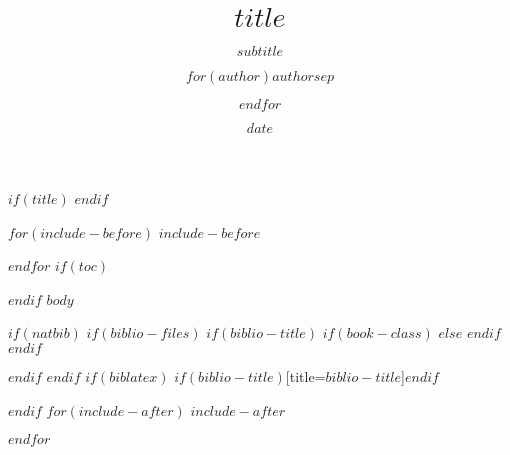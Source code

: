 \documentclass[aspectratio=169,$if(fontsize)$$fontsize$,$else$12pt,$endif$$if(handout)$handout,$endif$$if(beamer)$ignorenonframetext,$endif$$for(classoption)$$classoption$$sep$,$endfor$]{$documentclass$}
\title{$title$}
\subtitle{$subtitle$}
\author{$for(author)$$author$$sep$ \and $endfor$}
\date{$date$}
\institute{$institute$}
\begin{document}
$if(title)$
{
}
$endif$

$for(include-before)$
$include-before$

$endfor$
$if(toc)$
\begin{frame}
\tableofcontents[hideallsubsections]
\end{frame}

$endif$
$body$

$if(natbib)$
$if(biblio-files)$
$if(biblio-title)$
$if(book-class)$
\renewcommand\bibname{$biblio-title$}
$else$
\renewcommand\refname{$biblio-title$}
$endif$
$endif$


$endif$
$endif$
$if(biblatex)$
\printbibliography$if(biblio-title)$[title=$biblio-title$]$endif$

$endif$
$for(include-after)$
$include-after$

$endfor$
\end{document}
